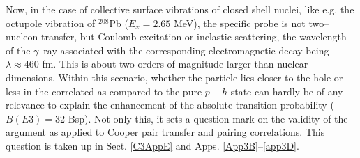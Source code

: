 Now, in the case of collective surface vibrations of closed shell nuclei, like e.g. the octupole vibration of $^{208}$Pb ($E_x=2.65$ MeV), the specific probe is not two--nucleon transfer, but Coulomb excitation or inelastic scattering,  the wavelength of the $\gamma$--ray associated with the corresponding electromagnetic decay being $\lambda\approx 460$ fm. This is about two orders of magnitude larger than nuclear dimensions. Within this scenario, whether  the particle lies closer to the hole or less in the correlated as compared to the pure $p-h$ state can hardly be of any relevance to explain  the enhancement of the absolute transition probability ($B(E3)=32$ Bsp). Not only this, it sets a question mark on the validity of the argument as applied to Cooper pair transfer and pairing correlations. This question is taken up in Sect.  
\ref{C3AppE} and Apps. \ref{App3B}--\ref{app3D}.







